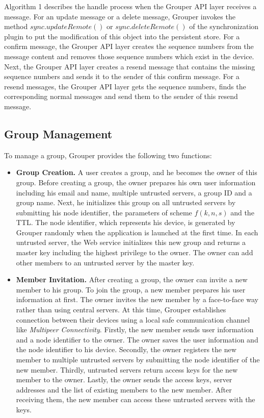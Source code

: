 \documentclass[twocolumn,10pt]{article}
\begin{document}
Algorithm 1 describes the handle process when the Grouper API layer receives a message.
For an update message or a delete message, Grouper invokes the method $sync.updateRemote()$ or $sync.deleteRemote()$ of the synchronization plugin to put the modification of this object into the persistent store.
For a confirm message, the Grouper API layer creates the sequence numbers from the message content and removes those sequence numbers which exist in the device.
Next, the Grouper API layer creates a resend message that contains the missing sequence numbers and sends it to the sender of this confirm message.
For a resend messages, the Grouper API layer gets the sequence numbers, finds the corresponding normal messages and send them to the sender of this resend message.

\subsection{Group Management}

To manage a group, Grouper provides the following two functions:

\begin{itemize}
	\setlength{\itemsep}{1pt}
	\setlength{\parskip}{0pt}
	\setlength{\parsep}{0pt}
	\item \textbf{Group Creation.}
	A user creates a group, and he becomes the owner of this group.  
	Before creating a group, the owner prepares his own user information including his email and name, multiple untrusted servers, a group ID and a group name. 
	Next, he initializes this group on all untrusted servers by submitting his node identifier, the parameters of scheme $f(k, n, s)$ and the TTL. 
	The node identifier, which represents his device, is generated by Grouper randomly when the application is launched at the first time. 
	In each untrusted server, the Web service initializes this new group and returns a master key including the highest privilege to the owner. 
	The owner can add other members to an untrusted server by the master key.
	\item \textbf{Member Invitation.} 
	After creating a group, the owner can invite a new member to his group. 
	To join the group, a new member prepares his user information at first. 
	The owner invites the new member by a face-to-face way rather than using central servers. 
	At this time, Grouper establishes connection between their devices using a local safe communication channel like \emph{Multipeer Connectivity}\cite{mc}. 
	Firstly, the new member sends user information and a node identifier to the owner. 
	The owner saves the user information and the node identifier to his device. 
	Secondly, the owner registers the new member to multiple untrusted servers by submitting the node identifier of the new member. 
	Thirdly, untrusted servers return access keys for the new member to the owner. 
	Lastly, the owner sends the access keys, server addresses and the list of existing members to the new member. 
	After receiving them, the new member can access these untrusted servers with the keys.
\end{itemize}
\end{document}

